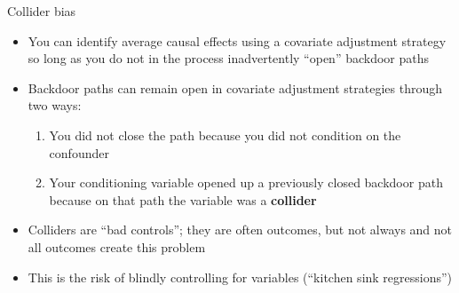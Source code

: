 \documentclass{beamer}
\begin{document}
\begin{frame}{Collider bias}

\begin{itemize}
\item You can identify average causal effects using a covariate adjustment strategy so long as you do not in the process inadvertently ``open'' backdoor paths
\item Backdoor paths can remain open in covariate adjustment strategies through two ways:
	\begin{enumerate}
	\item You did not close the path because you did not condition on the confounder
	\item Your conditioning variable opened up a previously closed backdoor path because on that path the variable was a \textbf{collider}
	\end{enumerate}
\item Colliders are ``bad controls''; they are often outcomes, but not always and not all outcomes create this problem
\item This is the risk of blindly controlling for variables (``kitchen sink regressions'')
\end{itemize}

\end{frame}
\end{document}
